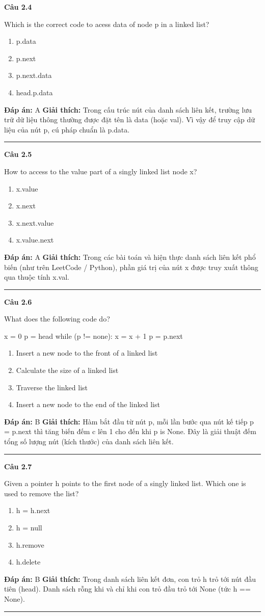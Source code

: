\documentclass[11pt,a4paper]{article}
\newenvironment{question}[1]{%
  \par\vspace{1em}\noindent\textbf{\large Câu #1}\par\vspace{0.4em}
}{%
  \par\vspace{1em}\hrule\vspace{0.6em}
}
\newenvironment{choices}{%
  \begin{enumerate}[label=\textbf{\Alph*.},leftmargin=2.2em,itemsep=2pt,topsep=3pt]
}{%
  \end{enumerate}
}
\newcommand{\choice}{\item}
\newenvironment{codebox}{%
  \begin{tcolorbox}[colback=gray!8!white,colframe=gray!50!black,arc=1.5mm,boxrule=0.6pt,left=3mm,right=3mm,top=2.5mm,bottom=2.5mm]
  \ttfamily\small
}{%
  \end{tcolorbox}
}
\begin{document}
\begin{question}{2.4}
Which is the correct code to acess data of node p in a linked list?
\begin{choices}
\choice p.data
\choice p.next
\choice p.next.data
\choice head.p.data
\end{choices}
\textbf{Đáp án:} A
\textbf{Giải thích:} Trong cấu trúc nút của danh sách liên kết, trường lưu trữ dữ liệu thông thường được đặt tên là data (hoặc val). Vì vậy để truy cập dữ liệu của nút p, cú pháp chuẩn là p.data.
\end{question}

\begin{question}{2.5}
How to access to the value part of a singly linked list node x?
\begin{choices}
\choice x.value
\choice x.next
\choice x.next.value
\choice x.value.next
\end{choices}
\textbf{Đáp án:} A
\textbf{Giải thích:} Trong các bài toán và hiện thực danh sách liên kết phổ biến (như trên LeetCode / Python), phần giá trị của nút x được truy xuất thông qua thuộc tính x.val.
\end{question}

\begin{question}{2.6}
What does the following code do?
\begin{codebox}
x = 0
p = head
while (p != none):
    x = x + 1
    p = p.next
\end{codebox}
\begin{choices}
\choice Insert a new node to the front of a linked list
\choice Calculate the size of a linked list
\choice Traverse the linked list
\choice Insert a new node to the end of the linked list
\end{choices}
\textbf{Đáp án:} B
\textbf{Giải thích:} Hàm bắt đầu từ nút p, mỗi lần bước qua nút kế tiếp p = p.next thì tăng biến đếm c lên 1 cho đến khi p is None. Đây là giải thuật đếm tổng số lượng nút (kích thước) của danh sách liên kết.
\end{question}

\begin{question}{2.7}
Given a pointer h points to the first node of a singly linked list. Which one is used to remove the list?
\begin{choices}
\choice h = h.next
\choice h = null
\choice h.remove
\choice h.delete
\end{choices}
\textbf{Đáp án:} B
\textbf{Giải thích:} Trong danh sách liên kết đơn, con trỏ h trỏ tới nút đầu tiên (head). Danh sách rỗng khi và chỉ khi con trỏ đầu trỏ tới None (tức h == None).
\end{question}
\end{document}
